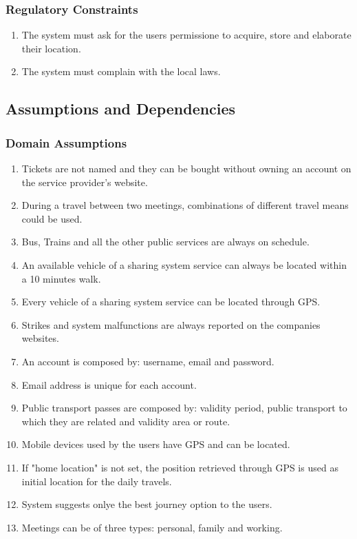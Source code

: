 \subsubsection{Regulatory Constraints}
\begin{enumerate}
\item
The system must ask for the users permissione to acquire, store and elaborate their location.
\item
The system must complain with the local laws.
\end{enumerate}

\subsection{Assumptions and Dependencies}
\subsubsection{Domain Assumptions}
\begin{enumerate}
\item
Tickets are not named and they can be bought without owning an account on the service provider's website.
\item
During a travel between two meetings, combinations of different travel means could be used.
\item
Bus, Trains and all the other public services are always on schedule.
\item
An available vehicle of a sharing system service can always be located within a 10 minutes walk.
\item
Every vehicle of a sharing system service can be located through GPS.
\item
Strikes and system malfunctions are always reported on the companies websites.
\item
An account is composed by: username, email and password.
\item
Email address is unique for each account.
\item
Public transport passes are composed by: validity period, public transport to which they are related and validity area or route.
\item
Mobile devices used by the users have GPS and can be located.
\item
If "home location" is not set, the position retrieved through GPS is used as initial location for the daily travels.
\item
System suggests onlye the best journey option to the users.
\item
Meetings can be of three types: personal, family and working.
	
\end{enumerate}